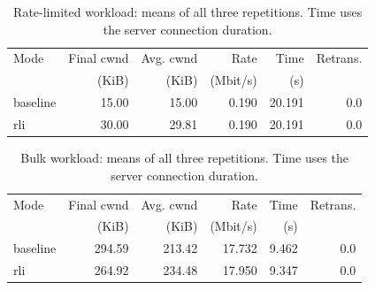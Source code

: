 \begin{table}[H]\centering\small
\begin{tabular}{lrrrrr}\toprule
Mode & Final cwnd & Avg. cwnd & Rate & Time & Retrans.\\
 & (KiB) & (KiB) & (Mbit/s) & (s) & \\\midrule
baseline & 15.00 & 15.00 & 0.190 & 20.191 & 0.0 \\
rli & 30.00 & 29.81 & 0.190 & 20.191 & 0.0 \\
\bottomrule\end{tabular}
\caption{Rate-limited workload: means of all three repetitions. Time uses the server connection duration.}\end{table}
\begin{table}[H]\centering\small
\begin{tabular}{lrrrrr}\toprule
Mode & Final cwnd & Avg. cwnd & Rate & Time & Retrans.\\
 & (KiB) & (KiB) & (Mbit/s) & (s) & \\\midrule
baseline & 294.59 & 213.42 & 17.732 & 9.462 & 0.0 \\
rli & 264.92 & 234.48 & 17.950 & 9.347 & 0.0 \\
\bottomrule\end{tabular}
\caption{Bulk workload: means of all three repetitions. Time uses the server connection duration.}\end{table}
